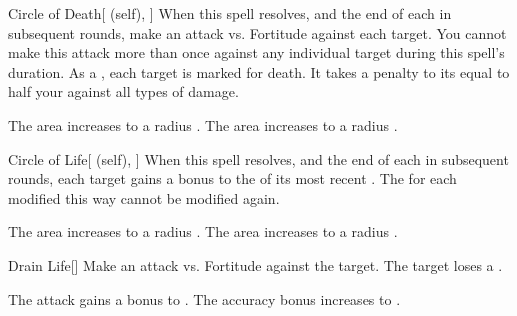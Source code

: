 \lowercase{\hypertarget{spell:Circle of Death}{}}\label{spell:Circle of Death}
\begin{attuneability}[Rank 3]{\hypertarget{spell:Circle of Death}{Circle of Death}}[ (self), ]
When this spell resolves, and the end of each  in subsequent rounds, make an attack vs. Fortitude against each target.
You cannot make this attack more than once against any individual target during this spell's duration.
\hit As a , each target is marked for death.
It takes a penalty to its  equal to half your  against all types of damage.

\rankline
{} The area increases to a \areamed radius .
 The area increases to a \arealarge radius .
\end{attuneability}
\vspace{0.25em}



\lowercase{\hypertarget{spell:Circle of Life}{}}\label{spell:Circle of Life}
\begin{attuneability}[Rank 3]{\hypertarget{spell:Circle of Life}{Circle of Life}}[ (self), ]
When this spell resolves, and the end of each  in subsequent rounds, each target gains a  bonus to the  of its most recent .
The  for each  modified this way cannot be modified again.

\rankline
{} The area increases to a \areamed radius .
 The area increases to a \arealarge radius .
\end{attuneability}
\vspace{0.25em}



\lowercase{\hypertarget{spell:Drain Life}{}}\label{spell:Drain Life}
\begin{freeability}[Rank 3]{\hypertarget{spell:Drain Life}{Drain Life}}[]
Make an attack vs. Fortitude against the target.
\hit The target loses a .

\rankline
{} The attack gains a  bonus to .
 The accuracy bonus increases to .
\end{freeability}
\vspace{0.25em}



